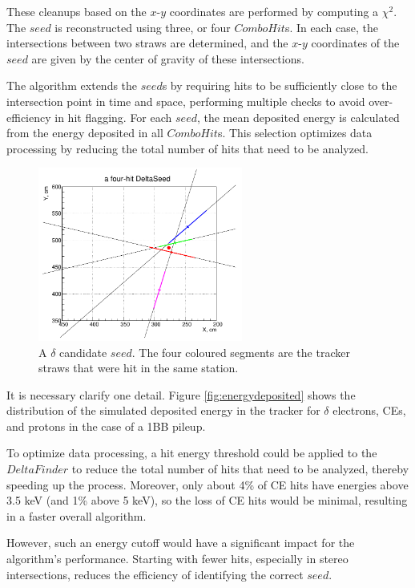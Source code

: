 These cleanups based on the $x$-$y$ coordinates are performed by computing a $\chi^2$. The $seed$ 
is reconstructed using three, or four $ComboHit$s. In each case, the intersections between two straws 
are determined, and the $x$-$y$ coordinates of the $seed$ are given 
by the center of gravity of these intersections. 

The algorithm extends the $seed$s by requiring 
hits to be sufficiently close to the intersection 
point in time and space, performing multiple checks 
to avoid over-efficiency in 
hit flagging. For each $seed$, 
the mean deposited energy is calculated from the energy 
deposited in all $ComboHit$s. 
This selection optimizes data processing by 
reducing the total number of hits that need to be analyzed.

\begin{figure}[!h]
    \centering
    \includegraphics[width =0.6\textwidth]{figures/png/Screenshot_20240811_115854.png}
    \caption[A $\delta$ candidate $seed$.]{A 
    $\delta$ candidate $seed$. The four 
    coloured segments are the tracker straws that were
    hit in the same station.}
    \label{fig:deltaseeds}
\end{figure}

It is necessary clarify one detail. 
Figure \ref{fig:energydeposited} shows the 
distribution of the simulated deposited energy 
in the tracker for $\delta$ electrons, CEs, and 
protons in the case of a 1BB pileup. 

To optimize data processing, a hit energy 
threshold could be applied to the $DeltaFinder$ 
to reduce the total number of hits that 
need to be analyzed, thereby speeding up the process. Moreover, only about 
4\% of CE hits have energies above 3.5 keV 
(and 1\% above 5 keV), so the loss of CE 
hits would be minimal, resulting in a 
faster overall algorithm. 

However, such an energy cutoff would have a 
significant impact for the algorithm's performance. 
Starting with fewer hits, especially in 
stereo intersections, reduces the efficiency of identifying the correct $seed$. 

